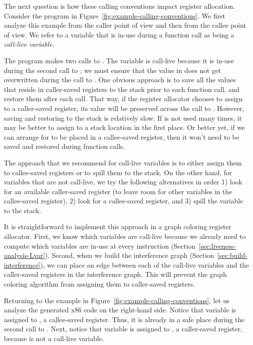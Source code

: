 \documentclass[7x10,nocrop]{TimesAPriori_MIT}%
\begin{document}
The next question is how these calling conventions impact register
allocation. Consider the \LangVar{} program in
Figure~\ref{fig:example-calling-conventions}.  We first analyze this
example from the caller point of view and then from the callee point
of view. We refer to a variable that is in-use during a function call
as being a \emph{call-live variable}.

The program makes two calls to \READOP{}.  The variable  is
call-live because it is in-use during the second call to \READOP{}; we
must ensure that the value in  does not get overwritten during
the call to \READOP{}.  One obvious approach is to save all the values
that reside in caller-saved registers to the stack prior to each
function call, and restore them after each call. That way, if the
register allocator chooses to assign  to a caller-saved
register, its value will be preserved across the call to \READOP{}.
However, saving and restoring to the stack is relatively slow. If
 is not used many times, it may be better to assign 
to a stack location in the first place. Or better yet, if we can
arrange for  to be placed in a callee-saved register, then it
won't need to be saved and restored during function calls.

The approach that we recommend for call-live variables is to either
assign them to callee-saved registers or to spill them to the
stack. On the other hand, for variables that are not call-live, we try
the following alternatives in order 1) look for an available
caller-saved register (to leave room for other variables in the
callee-saved register), 2) look for a callee-saved register, and 3)
spill the variable to the stack.

It is straightforward to implement this approach in a graph coloring
register allocator. First, we know which variables are call-live
because we already need to compute which variables are in-use at every
instruction (Section~\ref{sec:liveness-analysis-Lvar}). Second, when
we build the interference graph
(Section~\ref{sec:build-interference}), we can place an edge between
each of the call-live variables and the caller-saved registers in the
interference graph. This will prevent the graph coloring algorithm
from assigning them to caller-saved registers.

Returning to the example in
Figure~\ref{fig:example-calling-conventions}, let us analyze the
generated x86 code on the right-hand side. Notice that variable
 is assigned to , a callee-saved register. Thus, it
is already in a safe place during the second call to
. Next, notice that variable  is assigned to
, a caller-saved register, because  is not a
call-live variable.
\end{document}
